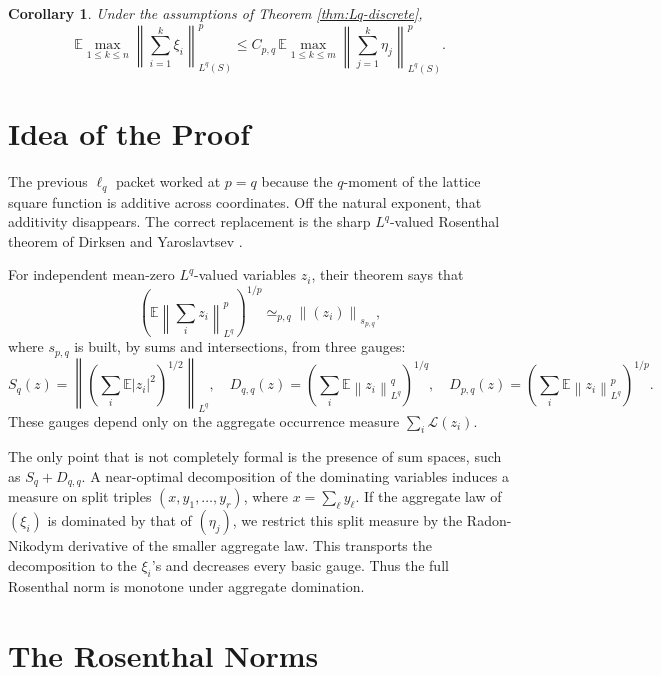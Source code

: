 \documentclass[11pt]{article}
\newtheorem{corollary}{Corollary}
\newcommand{\E}{\mathbb E}
\newcommand{\norm}[1]{\left\lVert #1\right\rVert}
\newcommand{\simequiv}{\simeq}
\begin{document}
\begin{corollary}\label{cor:maximal}
Under the assumptions of Theorem \ref{thm:Lq-discrete},
\[
   \E\max_{1\leq k\leq n}\norm{\sum_{i=1}^k\xi_i}_{L^q(S)}^p
   \leq
   C_{p,q}\,
   \E\max_{1\leq k\leq m}\norm{\sum_{j=1}^k\eta_j}_{L^q(S)}^p .
\]
\end{corollary}

\section*{Idea of the Proof}

The previous \(\ell_q\) packet worked at \(p=q\) because the \(q\)-moment of
the lattice square function is additive across coordinates.  Off the natural
exponent, that additivity disappears.  The correct replacement is the sharp
\(L^q\)-valued Rosenthal theorem of Dirksen and Yaroslavtsev
\cite{DirksenYaroslavtsev2017}.

For independent mean-zero \(L^q\)-valued variables \(z_i\), their theorem says
that
\[
   \left(\E\norm{\sum_i z_i}_{L^q}^p\right)^{1/p}
   \simequiv_{p,q}
   \norm{(z_i)}_{s_{p,q}},
\]
where \(s_{p,q}\) is built, by sums and intersections, from three gauges:
\[
  S_q(z)=\left\|\left(\sum_i\E |z_i|^2\right)^{1/2}\right\|_{L^q},
  \quad
  D_{q,q}(z)=\left(\sum_i\E\norm{z_i}_{L^q}^q\right)^{1/q},
  \quad
  D_{p,q}(z)=\left(\sum_i\E\norm{z_i}_{L^q}^p\right)^{1/p}.
\]
These gauges depend only on the aggregate occurrence measure
\(\sum_i\mathcal L(z_i)\).

The only point that is not completely formal is the presence of sum spaces,
such as \(S_q+D_{q,q}\).  A near-optimal decomposition of the dominating
variables induces a measure on split triples \((x,y_1,\ldots,y_r)\), where
\(x=\sum_\ell y_\ell\).  If the aggregate law of \((\xi_i)\) is dominated by
that of \((\eta_j)\), we restrict this split measure by the Radon-Nikodym
derivative of the smaller aggregate law.  This transports the decomposition to
the \(\xi_i\)'s and decreases every basic gauge.  Thus the full Rosenthal norm
is monotone under aggregate domination.

\section*{The Rosenthal Norms}
\end{document}
